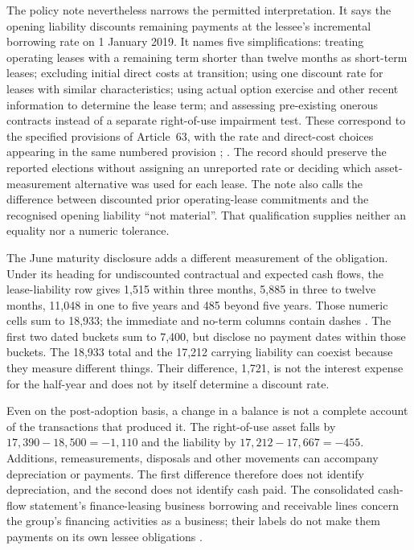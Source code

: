 The policy note nevertheless narrows the permitted interpretation. It says
the opening liability discounts remaining payments at the lessee's
incremental borrowing rate on 1 January 2019. It names five simplifications:
treating operating leases with a remaining term shorter than twelve months
as short-term leases; excluding initial direct costs at transition; using
one discount rate for leases with similar characteristics; using actual
option exercise and other recent information to determine the lease term;
and assessing pre-existing onerous contracts instead of a separate
right-of-use impairment test. These correspond to the specified provisions
of Article~63, with the rate and direct-cost choices appearing in the same
numbered provision \citep[p.\ 113]{pingan2019asbe};
\citep[attachment, art.\ 63]{moflease2018}. The record should preserve
the reported elections without assigning an unreported rate or deciding
which asset-measurement alternative was used for each lease. The note also
calls the difference between discounted prior operating-lease commitments
and the recognised opening liability ``not material''. That qualification
supplies neither an equality nor a numeric tolerance.

The June maturity disclosure adds a different measurement of the obligation.
Under its heading for undiscounted contractual and expected cash flows,
the lease-liability row gives 1,515 within three months, 5,885 in three to
twelve months, 11,048 in one to five years and 485 beyond five years. Those
numeric cells sum to 18,933; the immediate and no-term columns contain
dashes \citep[pp.\ 164--165]{pingan2019asbe}. The first two dated buckets
sum to 7,400, but disclose no payment dates within those buckets. The
18,933 total and the 17,212 carrying liability can coexist because they
measure different things. Their difference, 1,721, is not the interest
expense for the half-year and does not by itself determine a discount rate.

Even on the post-adoption basis, a change in a balance is not a complete
account of the transactions that produced it. The right-of-use asset falls
by $17{,}390-18{,}500=-1{,}110$ and the liability by
$17{,}212-17{,}667=-455$. Additions, remeasurements, disposals and other
movements can accompany depreciation or payments. The first difference
therefore does not identify depreciation, and the second does not identify
cash paid. The consolidated cash-flow statement's finance-leasing business
borrowing and receivable lines concern the group's financing activities as
a business; their labels do not make them payments on its own lessee
obligations \citep[pp.\ 106--107]{pingan2019asbe}.

